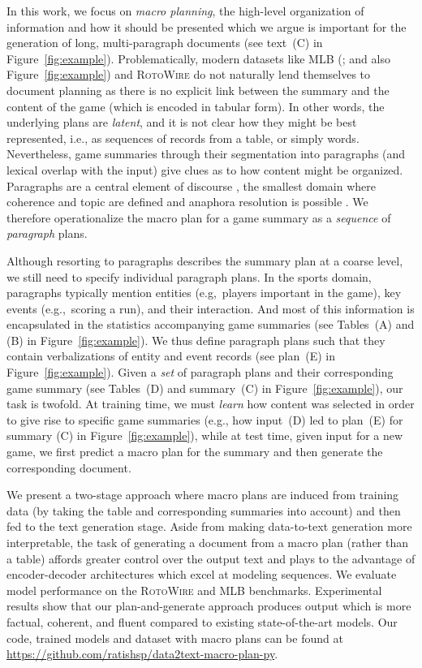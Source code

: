 \documentclass[11pt,a4paper]{article}
\begin{document}
In this work, we focus on \emph{macro planning}, the high-level
organization of information and how it should be presented which we
argue is important for the generation of long, multi-paragraph
documents (see text~(C) in Figure~\ref{fig:example}). Problematically,
modern datasets like MLB (\citealt{puduppully-etal-2019-data}; and
also Figure~\ref{fig:example}) and \textsc{RotoWire}
\cite{wiseman-etal-2017-challenges} do not naturally lend themselves
to document planning as there is no explicit link between the summary
and the content of the game (which is encoded in tabular form). In
other words, the underlying plans are \emph{latent}, and it is not
clear how they might be best represented, i.e., as sequences of
records from a table, or simply words. Nevertheless, game summaries
through their segmentation into paragraphs (and lexical overlap with
the input) give clues as to how content might be organized. Paragraphs
are a central element of discourse
\cite{Chafe:1979,Longacre:1979,Halliday:Hasan:76}, the smallest domain
where coherence and topic are defined and anaphora resolution is
possible \cite{zadrozny-jensen-1991-semantics}. We therefore
operationalize the macro plan for a game summary as a \emph{sequence}
of \emph{paragraph} plans.

Although resorting to paragraphs describes the summary plan at a
{coarse} level, we still need to specify individual paragraph
plans. In the sports domain, paragraphs typically mention entities
(e.g,~players important in the game), key events (e.g.,~scoring a
run), and their interaction. And most of this information is
encapsulated in the statistics accompanying game summaries (see
Tables~(A) and (B) in Figure~\ref{fig:example}). We thus define
paragraph plans such that they contain verbalizations of entity and
event records (see plan~(E) in Figure~\ref{fig:example}). Given a
\emph{set} of paragraph plans and their corresponding game summary
(see Tables~(D) and summary~(C) in Figure~\ref{fig:example}), our task
is twofold. At training time, we must \emph{learn} how content was
selected in order to give rise to specific game summaries (e.g., how
input~(D) led to plan~(E) for summary (C) in
Figure~\ref{fig:example}), while at test time, given input for a new
game, we first predict a macro plan for the summary and then generate
the corresponding document.


We present a two-stage approach where macro plans are induced from
training data (by taking the table and corresponding summaries into
account) and then fed to the text generation stage. Aside from making
data-to-text generation more interpretable, the task of generating a
document from a macro plan (rather than a table) affords greater
control over the output text and plays to the advantage of
encoder-decoder architectures which excel at modeling sequences.  We
evaluate model performance on the \textsc{RotoWire}
\cite{wiseman-etal-2017-challenges} and MLB
\cite{puduppully-etal-2019-data} benchmarks. Experimental results show
that our plan-and-generate approach produces output which is more
factual, coherent, and fluent compared to existing state-of-the-art
models. Our code, trained models and dataset with
macro plans can be found at 
\url{https://github.com/ratishsp/data2text-macro-plan-py}.
\end{document}
